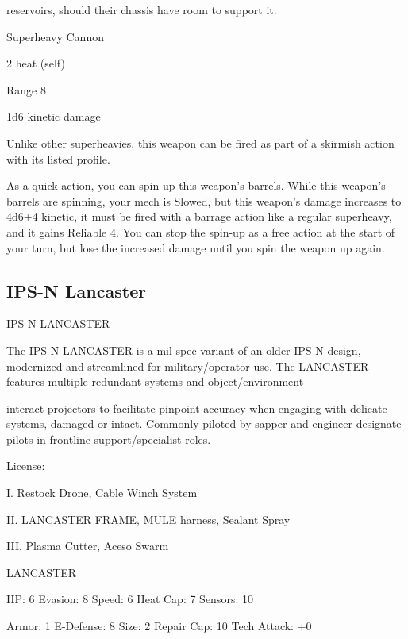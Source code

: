 reservoirs, should their chassis have room to support it.   

Superheavy Cannon
 
2 heat (self)
 
Range 8
 
1d6 kinetic damage
 

Unlike other superheavies, this weapon can be fired as part of a skirmish action with its listed  
profile.
 
As a quick action, you can spin up this weapon’s barrels. While this weapon’s barrels are  
spinning, your mech is Slowed, but this weapon’s damage increases to 4d6+4 kinetic, it must be  
fired with a barrage action like a regular superheavy, and it gains Reliable 4. You can stop the  
spin-up as a free action at the start of your turn, but lose the increased damage until you spin the  
weapon up again.
 

                                                                                                                     
\subsection{IPS-N Lancaster}

                                         IPS-N LANCASTER  

The IPS-N LANCASTER is a mil-spec variant of an older IPS-N design, modernized and streamlined for  
military/operator use. The LANCASTER features multiple redundant systems and object/environment- 

interact projectors to facilitate pinpoint accuracy when engaging with delicate systems, damaged or intact.  
Commonly piloted by sapper and engineer-designate pilots in frontline support/specialist roles. 
 

                                                   License:
 
I. Restock Drone, Cable Winch System
 
II. LANCASTER FRAME, MULE harness, Sealant Spray
 
III. Plasma Cutter, Aceso Swarm
 

                                                LANCASTER 

  HP: 6          Evasion: 8                            Speed: 6           Heat Cap: 7        Sensors: 10 

  Armor: 1       E-Defense: 8                          Size: 2            Repair Cap: 10     Tech Attack:  
                                                                                             +0 

